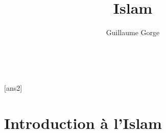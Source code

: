 \documentclass[justified,marginals=raggedright,notoc]{tufte-book}
\title{Islam}
\author[Guillaume Gorge]{Guillaume Gorge}
\begin{document}
\frontmatter






\maketitle

\newpage
\setcounter{page}{1}
\begin{fullwidth}
\tableofcontents
\end{fullwidth}




~\vfill
\begin{doublespace}
\noindent\fontsize{18}{22}\selectfont\itshape
\nohyphenation
\end{doublespace}
\vfill
\vfill


\cleardoublepage



 

[ans2]


\setcounter{page}{1}


\mainmatter

%
\part{Introduction à l'Islam}

%
%
%
%
%
%
%
%

\end{document}
